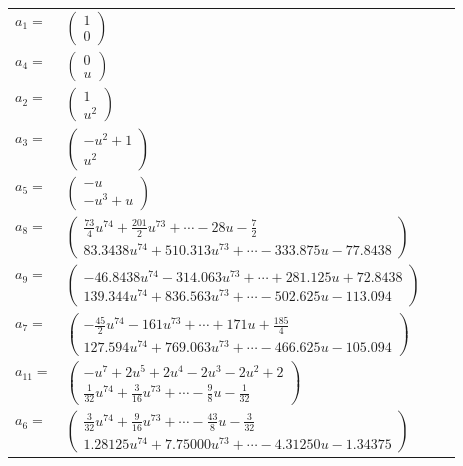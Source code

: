 \documentclass[1p]{elsarticle_modified}
\theoremstyle{definition}
\begin{document}
\begin{tabular}{m{7pt} m{180pt} m{7pt} m{180pt} }
\flushright $a_{1}=$&$\begin{pmatrix}1\\0\end{pmatrix}$ \\
\flushright $a_{4}=$&$\begin{pmatrix}0\\u\end{pmatrix}$ \\
\flushright $a_{2}=$&$\begin{pmatrix}1\\u^2\end{pmatrix}$ \\
\flushright $a_{3}=$&$\begin{pmatrix}- u^2+1\\u^2\end{pmatrix}$ \\
\flushright $a_{5}=$&$\begin{pmatrix}- u\\- u^3+u\end{pmatrix}$ \\
\flushright $a_{8}=$&$\begin{pmatrix}\frac{73}{4} u^{74}+\frac{201}{2} u^{73}+\cdots-28 u-\frac{7}{2}\\83.3438 u^{74}+510.313 u^{73}+\cdots-333.875 u-77.8438\end{pmatrix}$ \\
\flushright $a_{9}=$&$\begin{pmatrix}-46.8438 u^{74}-314.063 u^{73}+\cdots+281.125 u+72.8438\\139.344 u^{74}+836.563 u^{73}+\cdots-502.625 u-113.094\end{pmatrix}$ \\
\flushright $a_{7}=$&$\begin{pmatrix}-\frac{45}{2} u^{74}-161 u^{73}+\cdots+171 u+\frac{185}{4}\\127.594 u^{74}+769.063 u^{73}+\cdots-466.625 u-105.094\end{pmatrix}$ \\
\flushright $a_{11}=$&$\begin{pmatrix}- u^7+2 u^5+2 u^4-2 u^3-2 u^2+2\\\frac{1}{32} u^{74}+\frac{3}{16} u^{73}+\cdots-\frac{9}{8} u-\frac{1}{32}\end{pmatrix}$ \\
\flushright $a_{6}=$&$\begin{pmatrix}\frac{3}{32} u^{74}+\frac{9}{16} u^{73}+\cdots-\frac{43}{8} u-\frac{3}{32}\\1.28125 u^{74}+7.75000 u^{73}+\cdots-4.31250 u-1.34375\end{pmatrix}$ \\

\end{tabular}
\end{document}
